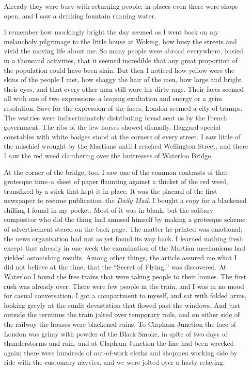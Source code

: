 Already they were busy with returning people; in places even there
were shops open, and I saw a drinking fountain running water.

I remember how mockingly bright the day seemed as I went back on my
melancholy pilgrimage to the little house at Woking, how busy the
streets and vivid the moving life about me. So many people were
abroad everywhere, busied in a thousand activities, that it seemed
incredible that any great proportion of the population could have
been slain. But then I noticed how yellow were the skins of the
people I met, how shaggy the hair of the men, how large and bright
their eyes, and that every other man still wore his dirty rags.
Their faces seemed all with one of two expressions--a leaping
exultation and energy or a grim resolution. Save for the expression
of the faces, London seemed a city of tramps. The vestries were
indiscriminately distributing bread sent us by the French
government. The ribs of the few horses showed dismally. Haggard
special constables with white badges stood at the corners of every
street. I saw little of the mischief wrought by the Martians until
I reached Wellington Street, and there I saw the red weed
clambering over the buttresses of Waterloo Bridge.

At the corner of the bridge, too, I saw one of the common contrasts
of that grotesque time--a sheet of paper flaunting against a
thicket of the red weed, transfixed by a stick that kept it in
place. It was the placard of the first newspaper to resume
publication--the \emph{Daily Mail}. I bought a copy for a blackened
shilling I found in my pocket. Most of it was in blank, but the
solitary compositor who did the thing had amused himself by making
a grotesque scheme of advertisement stereo on the back page. The
matter he printed was emotional; the news organisation had not as
yet found its way back. I learned nothing fresh except that already
in one week the examination of the Martian mechanisms had yielded
astonishing results. Among other things, the article assured me
what I did not believe at the time, that the ``Secret of Flying,''
was discovered. At Waterloo I found the free trains that were
taking people to their homes. The first rush was already over.
There were few people in the train, and I was in no mood for casual
conversation. I got a compartment to myself, and sat with folded
arms, looking greyly at the sunlit devastation that flowed past the
windows. And just outside the terminus the train jolted over
temporary rails, and on either side of the railway the houses were
blackened ruins. To Clapham Junction the face of London was grimy
with powder of the Black Smoke, in spite of two days of
thunderstorms and rain, and at Clapham Junction the line had been
wrecked again; there were hundreds of out-of-work clerks and
shopmen working side by side with the customary navvies, and we
were jolted over a hasty relaying.

